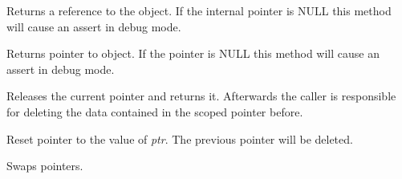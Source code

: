 
Returns a reference to the object. If the internal pointer is NULL
this method will cause an assert in debug mode.

\label{wxscopedptrtemplateoperatorderef}


Returns pointer to object. If the pointer is NULL this method will 
cause an assert in debug mode.

\label{wxscopedptrtemplaterelease}


Releases the current pointer and returns it.
Afterwards the caller is responsible for deleting
the data contained in the scoped pointer before.

\label{wxscopedptrtemplatereset}


Reset pointer to the value of {\it ptr}. The
previous pointer will be deleted.

\label{wxscopedptrtemplateswap}


Swaps pointers.

